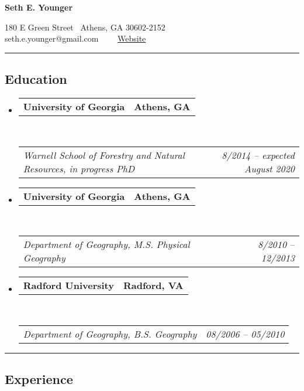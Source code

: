 \documentclass[10pt,letterpaper]{article}
\makeatletter
\newcommand{\headerrow}[2]
{\begin{tabular*}{\linewidth}{l@{\extracolsep{\fill}}r}
	#1 &
	#2 \\
\end{tabular*}}
\makeatother
\begin{document}
	

\begin{center}
{\LARGE \textbf{Seth E. Younger}}

180 E Green Street \textbullet
\ Athens, GA 30602-2152
\\
seth.e.younger@gmail.com\ \ \textbullet
\ \ \href{http://www.sethyounger.com}{Website}
\end{center}

\hrule
\vspace{-0.4em}
\subsection*{Education}

\begin{itemize}
	\parskip=0.1em
	
	\item 
	\headerrow
	{\textbf{University of Georgia}}
	{\textbf{Athens, GA}}
	\\
	\headerrow
	{\emph{Warnell School of Forestry and Natural Resources, in progress PhD}}
	{\emph{8/2014 -- expected August 2020}}
	
	\item 
	\headerrow
	{\textbf{University of Georgia}}
	{\textbf{Athens, GA}}
	\\
	\headerrow
	{\emph{Department of Geography, M.S. Physical Geography}}
	{\emph{8/2010 -- 12/2013}}
	
	\item 
	\headerrow
	{\textbf{Radford University}}
	{\textbf{Radford, VA}}
	\\
	\headerrow
	{\emph{Department of Geography, B.S. Geography}}
	{\emph{08/2006 -- 05/2010}}
	
\end{itemize}

\hrule
\vspace{-0.4em}
\subsection*{Experience}
\end{document}
